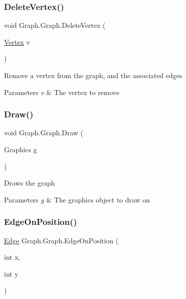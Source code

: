 \subsubsection{\texorpdfstring{Delete\+Vertex()}{DeleteVertex()}}
{\footnotesize\ttfamily void Graph.\+Graph.\+Delete\+Vertex (\begin{DoxyParamCaption}\item[{\hyperlink{class_graph_1_1_vertex}{Vertex}}]{v }\end{DoxyParamCaption})}



Remove a vertex from the graph, and the associated edges 


\begin{DoxyParams}{Parameters}
{\em v} & The vertex to remove\\
\hline
\end{DoxyParams}
\mbox{\label{class_graph_1_1_graph_a04383a2aa3ff3f112d7b87408d7d573e}} 
\subsubsection{\texorpdfstring{Draw()}{Draw()}}
{\footnotesize\ttfamily void Graph.\+Graph.\+Draw (\begin{DoxyParamCaption}\item[{Graphics}]{g }\end{DoxyParamCaption})}



Draws the graph 


\begin{DoxyParams}{Parameters}
{\em g} & The graphics object to draw on\\
\hline
\end{DoxyParams}
\mbox{\label{class_graph_1_1_graph_ade3b10eb74bb3a2c8b1cbbe0069adfca}} 
\subsubsection{\texorpdfstring{Edge\+On\+Position()}{EdgeOnPosition()}}
{\footnotesize\ttfamily \hyperlink{class_graph_1_1_edge}{Edge} Graph.\+Graph.\+Edge\+On\+Position (\begin{DoxyParamCaption}\item[{int}]{x,  }\item[{int}]{y }\end{DoxyParamCaption})}



